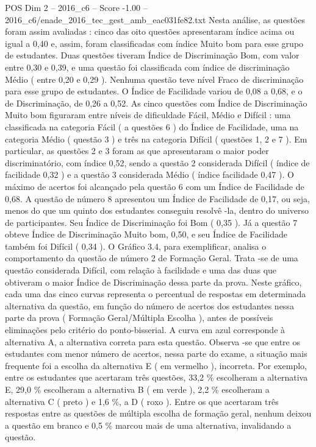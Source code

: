 \begin{textsample}{POS Dim 2 – 2016\_c6 – Score -1.00 – 2016\_c6/enade\_2016\_tec\_gest\_amb\_eac031fe82.txt}
Nesta análise, as questões foram assim avaliadas : cinco das oito questões apresentaram índice acima ou igual a 0,40 e, assim, foram classificadas com índice Muito bom para esse grupo de estudantes.
Duas questões tiveram Índice de Discriminação Bom, com valor entre 0,30 e 0,39, e uma questão foi classificada com índice de discriminação Médio ( entre 0,20 e 0,29 ).
Nenhuma questão teve nível Fraco de discriminação para esse grupo de estudantes.
O Índice de Facilidade variou de 0,08 a 0,68, e o de Discriminação, de 0,26 a 0,52.
As cinco questões com Índice de Discriminação Muito bom figuraram entre níveis de dificuldade Fácil, Médio e Difícil : uma classificada na categoria Fácil ( a questões 6 ) do Índice de Facilidade, uma na categoria Médio ( questão 3 ) e três na categoria Difícil ( questões 1, 2 e 7 ).
Em particular, as questões 2 e 3 foram as que apresentaram o maior poder discriminatório, com índice 0,52, sendo a questão 2 considerada Difícil ( índice de facilidade 0,32 ) e a questão 3 considerada Médio ( índice facilidade 0,47 ).
O máximo de acertos foi alcançado pela questão 6 com um Índice de Facilidade de 0,68.
A questão de número 8 apresentou um Índice de Facilidade de 0,17, ou seja, menos do que um quinto dos estudantes conseguiu resolvê -la, dentro do universo de participantes.
Seu Índice de Discriminação foi Bom ( 0,35 ).
Já a questão 7 obteve Índice de Discriminação Muito bom, 0,50, e seu Índice de Facilidade também foi Difícil ( 0,34 ).
O Gráfico 3.4, para exemplificar, analisa o comportamento da questão de número 2 de Formação Geral.
Trata -se de uma questão considerada Difícil, com relação à facilidade e uma das duas que obtiveram o maior Índice de Discriminação dessa parte da prova.
Neste gráfico, cada uma das cinco curvas representa o percentual de respostas em determinada alternativa da questão, em função do número de acertos dos estudantes nessa parte da prova ( Formação Geral/Múltipla Escolha ), antes de possíveis eliminações pelo critério do ponto-bisserial.
A curva em azul corresponde à alternativa A, a alternativa correta para esta questão.
Observa -se que entre os estudantes com menor número de acertos, nessa parte do exame, a situação mais frequente foi a escolha da alternativa E ( em vermelho ), incorreta.
Por exemplo, entre os estudantes que acertaram três questões, 33,2 \% escolheram a alternativa E, 29,0 \% escolheram a alternativa B ( em verde ), 2,2 \% escolheram a alternativa C ( preto ) e 1,6 \%, a D ( roxo ).
Entre os que acertaram três respostas entre as questões de múltipla escolha de formação geral, nenhum deixou a questão em branco e 0,5 \% marcou mais de uma alternativa, invalidando a questão.

\end{textsample}

